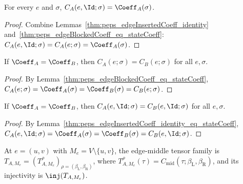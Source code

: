 \begin{lemma}%
    \label{thm:peps_edgeInsertedCoeff_identity_eq_stateCoeff}
    \leanok
    For every $e$ and $\sigma$, $C_A(e,\Id;\sigma)=\Coeff_A(\sigma)$.
\end{lemma}
\begin{proof}\leanok
    Combine Lemmas~\ref{thm:peps_edgeInsertedCoeff_identity}
    and~\ref{thm:peps_edgeBlockedCoeff_eq_stateCoeff}:
    $C_A(e,\Id;\sigma)=C_A(e;\sigma)=\Coeff_A(\sigma)$.
\end{proof}

\begin{lemma}%
    \label{thm:peps_sameState_edgeBlockedCoeff_eq}
    \leanok
    If $\Coeff_A=\Coeff_B$, then $C_A(e;\sigma) = C_B(e;\sigma)$ for all $e,\sigma$.
\end{lemma}
\begin{proof}\leanok
    By Lemma~\ref{thm:peps_edgeBlockedCoeff_eq_stateCoeff},
    $C_A(e;\sigma)=\Coeff_A(\sigma)=\Coeff_B(\sigma)=C_B(e;\sigma)$.
\end{proof}

\begin{lemma}%
    \label{thm:peps_sameState_edgeInsertedCoeff_identity_eq}
    \leanok
    If $\Coeff_A=\Coeff_B$, then $C_A(e,\Id;\sigma) = C_B(e,\Id;\sigma)$ for all
    $e,\sigma$.
\end{lemma}
\begin{proof}\leanok
    By Lemma~\ref{thm:peps_edgeInsertedCoeff_identity_eq_stateCoeff},
    $C_A(e,\Id;\sigma)=\Coeff_A(\sigma)=\Coeff_B(\sigma)=C_B(e,\Id;\sigma)$.
\end{proof}

\begin{definition}%
    \label{def:peps_edgeMiddleTensorFamily}
    \leanok
    At $e=(u,v)$ with $M_e=V\setminus\{u,v\}$, the edge-middle tensor family is
    $T_{A,M_e}=(T_{A,M_e}^{\rho})_{\rho=(\beta_{\mathrm{L}},\beta_{\mathrm{R}})}$,
    where $T_{A,M_e}^{\rho}(\tau)=C_{\mathrm{mid}}(\tau;\beta_{\mathrm{L}},\beta_{\mathrm{R}})$,
    and its injectivity is $\inj(T_{A,M_e})$.
\end{definition}


